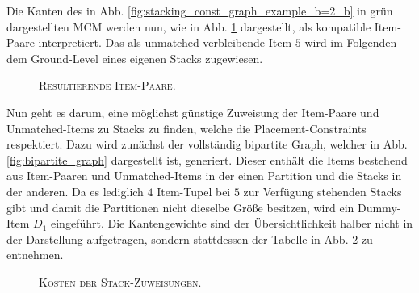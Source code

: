 Die Kanten des in Abb. \ref{fig:stacking_const_graph_example_b=2_b} in grün dargestellten \textsc{MCM} werden nun,
wie in Abb. \ref{fig:item_pairs_b=2} dargestellt, als kompatible Item-Paare interpretiert. Das als unmatched verbleibende
Item $5$ wird im Folgenden dem Ground-Level eines eigenen Stacks zugewiesen.
\begin{figure}[H]
\centering
{}
  \caption{\textsc{Resultierende Item-Paare.}}
  \label{fig:item_pairs_b=2}
\end{figure}

Nun geht es darum, eine möglichst günstige Zuweisung der Item-Paare und Unmatched-Items zu Stacks zu finden,
welche die Placement-Constraints respektiert. Dazu wird zunächst der vollständig bipartite Graph, welcher in
Abb. \ref{fig:bipartite_graph} dargestellt ist, generiert. Dieser enthält die Items bestehend aus Item-Paaren
und Unmatched-Items in der einen Partition und die Stacks in der anderen.
Da es lediglich $4$ Item-Tupel bei $5$ zur Verfügung stehenden Stacks gibt und damit die Partitionen nicht
dieselbe Größe besitzen, wird ein Dummy-Item $D_1$ eingeführt.
Die Kantengewichte sind der Übersichtlichkeit halber nicht in der Darstellung aufgetragen,
sondern stattdessen der Tabelle in Abb. \ref{fig:item_tuple_costs} zu entnehmen.

\begin{figure}[H]
\centering
{}
\caption{\textsc{Kosten der Stack-Zuweisungen}.}
\label{fig:item_tuple_costs}
\end{figure}

